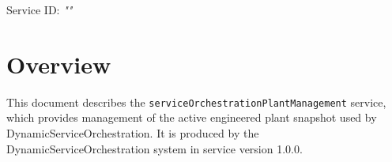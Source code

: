 \documentclass[a4paper]{arrowhead}
\begin{document}
\sloppy

\ArrowheadSetup

\begin{center}
  \vspace*{1cm}
  \huge{\arrowtitle}

  \vspace*{0.2cm}
  \LARGE{\arrowtype}
  \vspace*{1cm}

  \Large{Service ID: \textit{"\arrowid"}}

  \vspace*{\fill}


  \vspace*{1cm}
  \vspace*{\fill}

  \begin{abstract}
    This document describes the \texttt{service\allowbreak{}Orchestration\allowbreak{}Plant\allowbreak{}Management} service, version 1.0.0, produced by the DynamicServiceOrchestration core system of Arrowhead 5.2.2.
  \end{abstract}

  \vspace*{1cm}
\end{center}

\newpage

\tableofcontents
\newpage

\section{Overview}
\label{sec:overview}

This document describes the \texttt{service\allowbreak{}Orchestration\allowbreak{}Plant\allowbreak{}Management} service, which provides management of the active engineered plant snapshot used by Dynamic\allowbreak{}Service\allowbreak{}Orchestration.
It is produced by the DynamicServiceOrchestration system \cite{dso-sysd} in service version 1.0.0.
\end{document}
